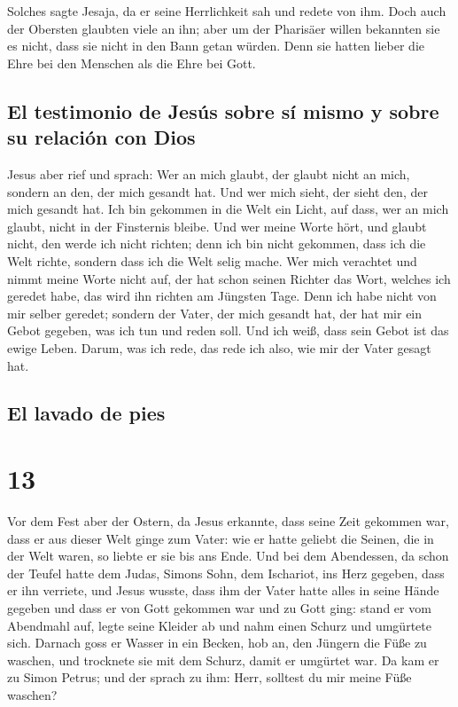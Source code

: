  Solches sagte Jesaja, da er seine Herrlichkeit sah und
redete von ihm.  Doch auch der Obersten glaubten viele an
ihn; aber um der Pharisäer willen bekannten sie es nicht, dass sie nicht
in den Bann getan würden.  Denn sie hatten lieber die
Ehre bei den Menschen als die Ehre bei Gott.

\hypertarget{el-testimonio-de-jesuxfas-sobre-suxed-mismo-y-sobre-su-relaciuxf3n-con-dios}{%
\subsection{El testimonio de Jesús sobre sí mismo y sobre su relación
con
Dios}\label{el-testimonio-de-jesuxfas-sobre-suxed-mismo-y-sobre-su-relaciuxf3n-con-dios}}

 Jesus aber rief und sprach: Wer an mich glaubt, der
glaubt nicht an mich, sondern an den, der mich gesandt hat.
 Und wer mich sieht, der sieht den, der mich gesandt hat.
 Ich bin gekommen in die Welt ein Licht, auf dass, wer an
mich glaubt, nicht in der Finsternis bleibe.  Und wer
meine Worte hört, und glaubt nicht, den werde ich nicht richten; denn
ich bin nicht gekommen, dass ich die Welt richte, sondern dass ich die
Welt selig mache.  Wer mich verachtet und nimmt meine
Worte nicht auf, der hat schon seinen Richter das Wort, welches ich
geredet habe, das wird ihn richten am Jüngsten Tage. 
Denn ich habe nicht von mir selber geredet; sondern der Vater, der mich
gesandt hat, der hat mir ein Gebot gegeben, was ich tun und reden soll.
 Und ich weiß, dass sein Gebot ist das ewige Leben.
Darum, was ich rede, das rede ich also, wie mir der Vater gesagt hat.

\hypertarget{el-lavado-de-pies}{%
\subsection{El lavado de pies}\label{el-lavado-de-pies}}

\hypertarget{section-12}{%
\section{13}\label{section-12}}

 Vor dem Fest aber der Ostern, da Jesus erkannte, dass
seine Zeit gekommen war, dass er aus dieser Welt ginge zum Vater: wie er
hatte geliebt die Seinen, die in der Welt waren, so liebte er sie bis
ans Ende.  Und bei dem Abendessen, da schon der Teufel
hatte dem Judas, Simons Sohn, dem Ischariot, ins Herz gegeben, dass er
ihn verriete,  und Jesus wusste, dass ihm der Vater hatte
alles in seine Hände gegeben und dass er von Gott gekommen war und zu
Gott ging:  stand er vom Abendmahl auf, legte seine
Kleider ab und nahm einen Schurz und umgürtete sich. 
Darnach goss er Wasser in ein Becken, hob an, den Jüngern die Füße zu
waschen, und trocknete sie mit dem Schurz, damit er umgürtet war.
 Da kam er zu Simon Petrus; und der sprach zu ihm: Herr,
solltest du mir meine Füße waschen?

